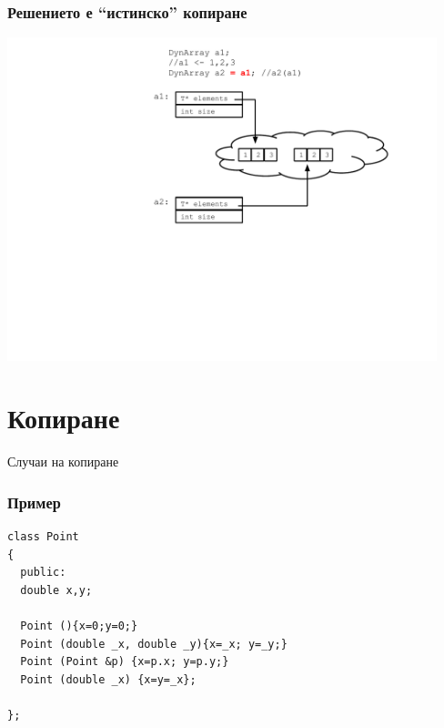 \documentclass{beamer}
\begin{document}
\begin{frame}[fragile]
\frametitle{Решението е ``истинско'' копиране}
\includegraphics[width=12.5cm]{images/memshare_05}
\end{frame}



\section{Копиране} 


\begin{frame}
\centerline{Случаи на копиране}
\end{frame}

\begin{frame}[fragile]
\frametitle{Пример}


\begin{flushleft}
\begin{lstlisting}
class Point
{
  public:
  double x,y;

  Point (){x=0;y=0;}
  Point (double _x, double _y){x=_x; y=_y;}
  Point (Point &p) {x=p.x; y=p.y;}
  Point (double _x) {x=y=_x};

};
\end{lstlisting}  
\end{flushleft}

\end{frame}
\end{document}
